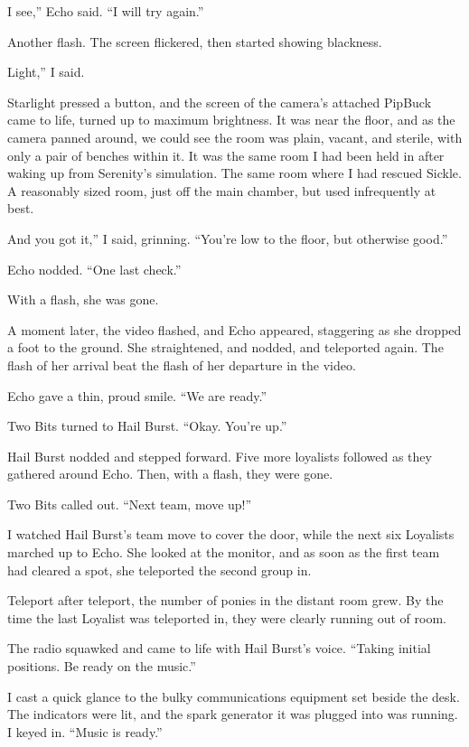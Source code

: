 \leavevmode{}I see,” Echo said. “I will try again.”

Another flash. The screen flickered, then started showing blackness.

\leavevmode{}Light,” I said.

Starlight pressed a button, and the screen of the camera’s attached PipBuck came to life, turned up to maximum brightness. It was near the floor, and as the camera panned around, we could see the room was plain, vacant, and sterile, with only a pair of benches within it. It was the same room I had been held in after waking up from Serenity’s simulation. The same room where I had rescued Sickle. A reasonably sized room, just off the main chamber, but used infrequently at best.

\leavevmode{}And you got it,” I said, grinning. “You’re low to the floor, but otherwise good.”

Echo nodded. “One last check.”

With a flash, she was gone.

A moment later, the video flashed, and Echo appeared, staggering as she dropped a foot to the ground. She straightened, and nodded, and teleported again. The flash of her arrival beat the flash of her departure in the video.

Echo gave a thin, proud smile. “We are ready.”

Two Bits turned to Hail Burst. “Okay. You’re up.”

Hail Burst nodded and stepped forward. Five more loyalists followed as they gathered around Echo. Then, with a flash, they were gone.

Two Bits called out. “Next team, move up!”

I watched Hail Burst’s team move to cover the door, while the next six Loyalists marched up to Echo. She looked at the monitor, and as soon as the first team had cleared a spot, she teleported the second group in.

Teleport after teleport, the number of ponies in the distant room grew. By the time the last Loyalist was teleported in, they were clearly running out of room.

The radio squawked and came to life with Hail Burst’s voice. “Taking initial positions. Be ready on the music.”

I cast a quick glance to the bulky communications equipment set beside the desk. The indicators were lit, and the spark generator it was plugged into was running. I keyed in. “Music is ready.”

